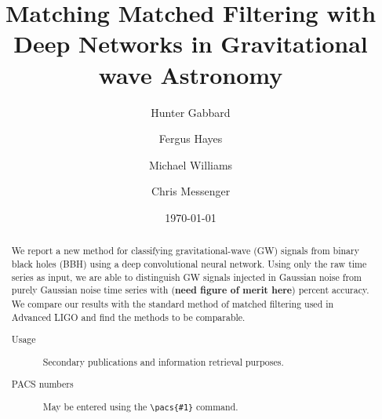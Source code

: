 \documentclass[%
 amsmath,amssymb,
 aps,
 twocolumn,
]{revtex4-1}
\begin{document}

\title{Matching Matched Filtering with Deep Networks in Gravitational wave Astronomy}%

\author{Hunter Gabbard}%
\author{Fergus Hayes}
\author{Michael Williams}%
\author{Chris Messenger} 
%

\date{\today}%

\begin{abstract}
 We report a new method for classifying gravitational-wave (GW) signals from binary black holes (BBH) using a deep convolutional neural network. Using only the raw time series as input, we are able to distinguish GW signals injected in Gaussian noise from purely Gaussian noise time series with (\textbf{need figure of merit here}) percent accuracy. We compare our results with the standard method of matched filtering used in Advanced LIGO and find the methods to be comparable.  
\begin{description}
\item[Usage]
Secondary publications and information retrieval purposes.
\item[PACS numbers]
May be entered using the \verb+\pacs{#1}+ command.
\end{description}
\end{abstract}

\maketitle



\end{document}

